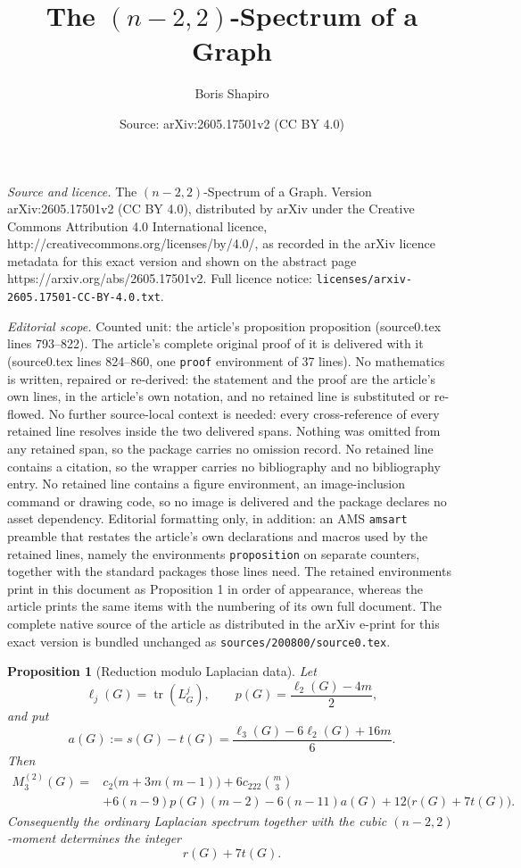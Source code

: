\documentclass[10pt,a4paper]{amsart}
\title{The $(n-2,2)$-Spectrum of a Graph}
\author{Boris Shapiro}
\date{Source: arXiv:2605.17501v2 (CC BY 4.0)}
\newtheorem{proposition}{Proposition}
\newcommand{\tr}{\operatorname{tr}}
\begin{document}
\maketitle

\noindent\emph{Source and licence.} The $(n-2,2)$-Spectrum of a Graph. Version arXiv:2605.17501v2 (CC BY 4.0), distributed by arXiv under the Creative Commons Attribution 4.0 International licence, http://creativecommons.org/licenses/by/4.0/, as recorded in the arXiv licence metadata for this exact version and shown on the abstract page https://arxiv.org/abs/2605.17501v2. Full licence notice: \texttt{licenses/arxiv-2605.17501-CC-BY-4.0.txt}.\par\smallskip

\noindent\textit{Editorial scope.} Counted unit: the article's proposition proposition (source0.tex lines 793--822). The article's complete original proof of it is delivered with it (source0.tex lines 824--860, one \texttt{proof} environment of 37 lines). No mathematics is written, repaired or re-derived: the statement and the proof are the article's own lines, in the article's own notation, and no retained line is substituted or re-flowed.  No further source-local context is needed: every cross-reference of every retained line resolves inside the two delivered spans.  Nothing was omitted from any retained span, so the package carries no omission record.  No retained line contains a citation, so the wrapper carries no bibliography and no bibliography entry.  No retained line contains a figure environment, an image-inclusion command or drawing code, so no image is delivered and the package declares no asset dependency.  Editorial formatting only, in addition: an AMS \texttt{amsart} preamble that restates the article's own declarations and macros used by the retained lines, namely the environments \texttt{proposition} on separate counters, together with the standard packages those lines need.  The retained environments print in this document as Proposition 1 in order of appearance, whereas the article prints the same items with the numbering of its own full document.  The complete native source of the article as distributed in the arXiv e-print for this exact version is bundled unchanged as \texttt{sources/200800/source0.tex}.
\begin{proposition}[Reduction modulo Laplacian data]
Let
\[
\ell_j(G)=\tr(L_G^j),\qquad
p(G)=\frac{\ell_2(G)-4m}{2},
\]
and put
\[
a(G):=s(G)-t(G)
=\frac{\ell_3(G)-6\ell_2(G)+16m}{6}.
\tag{7.5}
\]
Then
\[
\begin{aligned}
M_3^{(2)}(G)={}&
 c_2\bigl(m+3m(m-1)\bigr)
 +6c_{222}\binom m3 \\
&+6(n-9)p(G)(m-2)-6(n-11)a(G)
 +12\bigl(r(G)+7t(G)\bigr).
\end{aligned}
\tag{7.6}
\]
Consequently the ordinary Laplacian spectrum together with the cubic
$(n-2,2)$-moment determines the integer
\[
r(G)+7t(G).
\tag{7.7}
\]
\end{proposition}
\end{document}
